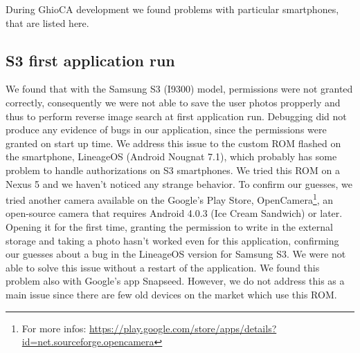 During GhioCA development we found problems with particular smartphones, that
are listed here.

\subsection{S3 first application run}

We found that with the Samsung S3 (I9300) model, permissions were not granted
correctly, consequently we were not able to save the user photos propperly and 
thus to perform reverse image search at first application run. Debugging did
not produce any evidence of bugs in our application, since the permissions were
granted on start up time.
We address this issue to the custom ROM flashed on the smartphone, LineageOS
(Android Nougnat 7.1), which probably has some problem to handle authorizations
on S3 smartphones. We tried this ROM on a Nexus 5 and we haven't noticed any
strange behavior.
To confirm our guesses, we tried another camera available on the Google's Play
Store, OpenCamera\footnote{For more infos:
\url{https://play.google.com/store/apps/details?id=net.sourceforge.opencamera}},
 an open-source camera that requires Android 4.0.3 (Ice Cream Sandwich) or
later.
Opening it for the first time, granting the permission to write in the external
storage and taking a photo hasn't worked even for this application, confirming
our guesses about a bug in the LineageOS version for Samsung S3.
We were not able to solve this issue without a restart of the application.
We found this problem also with Google's app Snapseed.
However, we do not address this as a main issue since there are few old devices
on the market which use this ROM.
